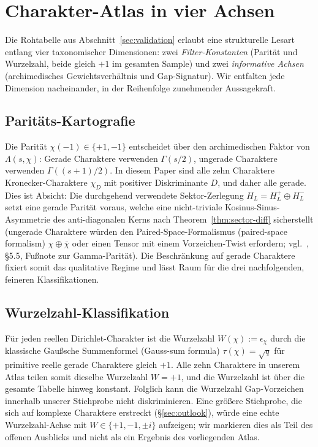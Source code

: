 \documentclass[10pt,twocolumn]{article}
\theoremstyle{definition}
\theoremstyle{remark}
\newcommand{\chifn}{\chi}
\begin{document}
\section{Charakter-Atlas in vier Achsen}
\label{sec:atlas}

Die Rohtabelle aus Abschnitt~\ref{sec:validation} erlaubt eine strukturelle
Lesart entlang vier taxonomischer Dimensionen: zwei \emph{Filter-Konstanten}
(Parität und Wurzelzahl, beide gleich $+1$ im gesamten Sample) und zwei
\emph{informative Achsen} (archimedisches Gewichtsverhältnis und Gap-Signatur).
Wir entfalten jede Dimension nacheinander, in der Reihenfolge zunehmender
Aussagekraft.

\subsection{Paritäts-Kartografie}
\label{sec:parity}

Die Parität $\chifn(-1)\in\{+1,-1\}$ entscheidet über den archimedischen Faktor von
$\Lambda(s,\chifn)$: Gerade Charaktere verwenden $\Gamma(s/2)$, ungerade
Charaktere verwenden $\Gamma((s+1)/2)$. In diesem Paper sind alle zehn Charaktere
Kronecker-Charaktere $\chifn_D$ mit positiver Diskriminante $D$, und
daher alle gerade. Dies ist Absicht: Die durchgehend verwendete Sektor-Zerlegung
$H_L=H_L^+\oplus H_L^-$ setzt eine gerade Parität voraus, welche
eine nicht-triviale Kosinus-Sinus-Asymmetrie des anti-diagonalen Kerns
nach Theorem~\ref{thm:sector-diff} sicherstellt (ungerade Charaktere würden
den Paired-Space-Formalismus (paired-space formalism)
$\chifn\oplus\bar\chifn$ oder einen Tensor mit einem Vorzeichen-Twist erfordern; vgl.\
\cite{MetaGalerkinBridge}, \S5.5, Fußnote zur Gamma-Parität). Die
Beschränkung auf gerade Charaktere fixiert somit das qualitative Regime und lässt Raum
für die drei nachfolgenden, feineren Klassifikationen.

\subsection{Wurzelzahl-Klassifikation}
\label{sec:rootnumber}

Für jeden reellen Dirichlet-Charakter ist die Wurzelzahl $W(\chifn):=
\epsilon_{\chifn}$ durch die klassische Gaußsche Summenformel (Gauss-sum formula)
$\tau(\chifn)=\sqrt{q}$ für primitive reelle gerade Charaktere \cite{IwaniecKowalski}
gleich $+1$. Alle zehn Charaktere in unserem Atlas teilen somit
dieselbe Wurzelzahl $W=+1$, und die Wurzelzahl ist über die gesamte Tabelle
hinweg konstant. Folglich kann die Wurzelzahl Gap-Vorzeichen
innerhalb unserer Stichprobe nicht diskriminieren. Eine größere Stichprobe, die sich auf komplexe
Charaktere erstreckt (\S\ref{sec:outlook}), würde eine echte Wurzelzahl-Achse
mit $W\in\{+1,-1,\pm i\}$ aufzeigen; wir markieren dies als Teil des offenen
Ausblicks und nicht als ein Ergebnis des vorliegenden Atlas.
\end{document}
